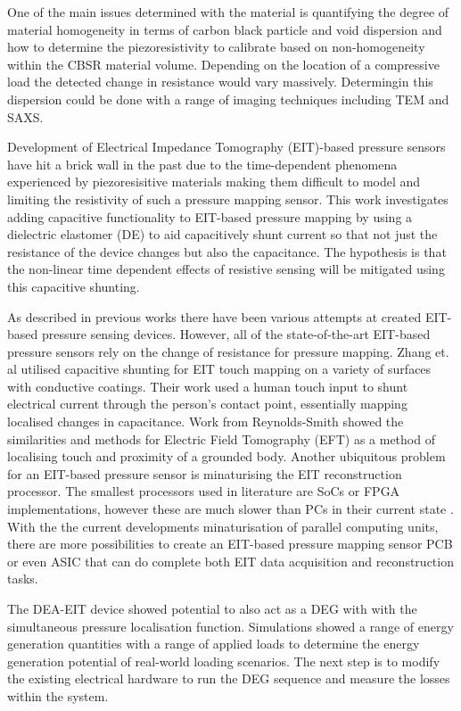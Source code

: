One of the main issues determined with the material is quantifying the degree of material homogeneity in terms of carbon black particle and void dispersion and how to determine the piezoresistivity to calibrate based on non-homogeneity within the CBSR material volume. Depending on the location of a compressive load the detected change in resistance would vary massively. Determingin this dispersion could be done with a range of imaging techniques including TEM and SAXS.

Development of Electrical Impedance Tomography (EIT)-based pressure sensors have hit a brick wall in the past due to the time-dependent phenomena experienced by piezoresisitive materials making them difficult to model and limiting the resistivity of such a pressure mapping sensor. This work investigates adding capacitive functionality to EIT-based pressure mapping by using a dielectric elastomer (DE) to aid capacitively shunt current so that not just the resistance of the device changes but also the capacitance. The hypothesis is that the non-linear time dependent effects of resistive sensing will be mitigated using this capacitive shunting.

As described in previous works \cite{Ellingham2024} there have been various attempts at created EIT-based pressure sensing devices. However, all of the state-of-the-art EIT-based pressure sensors rely on the change of resistance for pressure mapping. Zhang et. al \cite{Zhang2017} utilised capacitive shunting for EIT touch mapping on a variety of surfaces with conductive coatings. Their work used a human touch input to shunt electrical current through the person's contact point, essentially mapping localised changes in capacitance. Work from Reynolds-Smith \cite{Reynoldssmith1995,Reynoldssmith1999} showed the similarities and methods for Electric Field Tomography (EFT) as a method of localising touch and proximity of a grounded body. Another ubiquitous problem for an EIT-based pressure sensor is minaturising the EIT reconstruction processor. The smallest processors used in literature are SoCs or FPGA implementations, however these are much slower than PCs in their current state \cite{ZamoraArellano2020,Kim2017,Takhti2019,Liu2019}. With the the current developments minaturisation of parallel computing units, there are more possibilities to create an EIT-based pressure mapping sensor PCB or even ASIC that can do complete both EIT data acquisition and reconstruction tasks.

The DEA-EIT device showed potential to also act as a DEG with with the simultaneous pressure localisation function. Simulations showed a range of energy generation quantities with a range of applied loads to determine the energy generation potential of real-world loading scenarios. The next step is to modify the existing electrical hardware to run the DEG sequence and measure the losses within the system.



